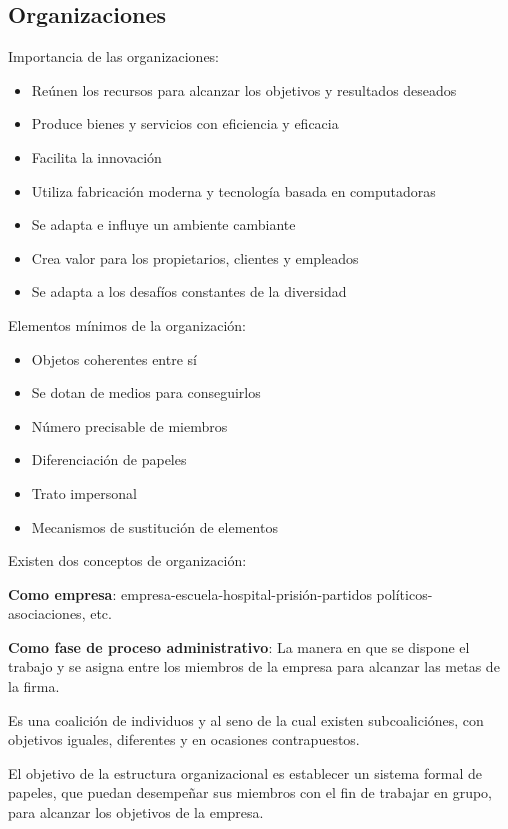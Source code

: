 \subsection{Organizaciones}
Importancia de las organizaciones:
\begin{itemize}
    \item Reúnen los recursos para alcanzar los objetivos y resultados deseados
    \item Produce bienes y servicios con eficiencia y eficacia 
    \item Facilita la innovación
    \item Utiliza fabricación moderna y tecnología basada en computadoras
    \item Se adapta e influye un ambiente cambiante
    \item Crea valor para los propietarios, clientes y empleados
    \item Se adapta a los desafíos constantes de la diversidad
\end{itemize}

Elementos mínimos de la organización:
\begin{itemize}
    \item Objetos coherentes entre sí
    \item Se dotan de medios para conseguirlos
    \item Número precisable de miembros
    \item Diferenciación de papeles
    \item Trato impersonal
    \item Mecanismos de sustitución de elementos
\end{itemize}
Existen dos conceptos de organización:

\textbf{Como empresa}: empresa-escuela-hospital-prisión-partidos políticos- asociaciones, etc.

\textbf{Como fase de proceso administrativo}: La manera en que se dispone el trabajo y se asigna entre los miembros de la empresa para alcanzar las metas de la firma.

\begin{definition}[Organización]
    Es una coalición de individuos y al seno de la cual existen subcoaliciónes, con objetivos iguales, diferentes y en ocasiones contrapuestos.
\end{definition}

El objetivo de la estructura organizacional es establecer un sistema formal de papeles, que puedan desempeñar sus miembros con el fin de trabajar en grupo, para alcanzar los objetivos de la empresa.

